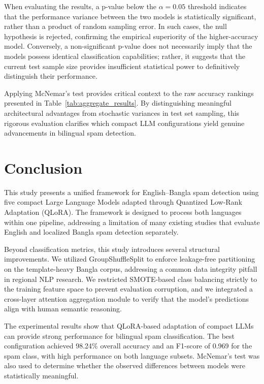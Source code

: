 \documentclass[journal]{IEEEtran}
\begin{document}
When evaluating the results, a p-value below the $\alpha = 0.05$ threshold indicates that the performance variance between the two models is statistically significant, rather than a product of random sampling error. In such cases, the null hypothesis is rejected, confirming the empirical superiority of the higher-accuracy model. Conversely, a non-significant p-value does not necessarily imply that the models possess identical classification capabilities; rather, it suggests that the current test sample size provides insufficient statistical power to definitively distinguish their performance.

Applying McNemar's test provides critical context to the raw accuracy rankings presented in Table~\ref{tab:aggregate_results}. By distinguishing meaningful architectural advantages from stochastic variances in test set sampling, this rigorous evaluation clarifies which compact LLM configurations yield genuine advancements in bilingual spam detection.

\balance
\section{Conclusion}

This study presents a unified framework for English--Bangla spam detection using five compact Large Language Models adapted through Quantized Low-Rank Adaptation (QLoRA). The framework is designed to process both languages within one pipeline, addressing a limitation of many existing studies that evaluate English and localized Bangla spam detection separately.

Beyond classification metrics, this study introduces several structural improvements. We utilized GroupShuffleSplit to enforce leakage-free partitioning on the template-heavy Bangla corpus, addressing a common data integrity pitfall in regional NLP research. We restricted SMOTE-based class balancing strictly to the training feature space to prevent evaluation corruption, and we integrated a cross-layer attention aggregation module to verify that the model's predictions align with human semantic reasoning.

The experimental results show that QLoRA-based adaptation of compact LLMs can provide strong performance for bilingual spam classification. The best configuration achieved 98.24\% overall accuracy and an F1-score of 0.969 for the spam class, with high performance on both language subsets. McNemar's test was also used to determine whether the observed differences between models were statistically meaningful.
\end{document}
